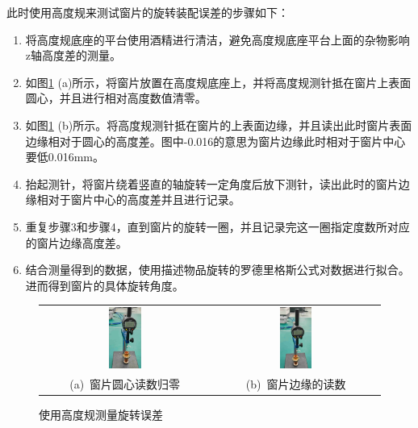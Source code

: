 \documentclass[master]{thesis-uestc}
\begin{document}
此时使用高度规来测试窗片的旋转装配误差的步骤如下：
\begin{enumerate}
    \item 将高度规底座的平台使用酒精进行清洁，避免高度规底座平台上面的杂物影响z轴高度差的测量。
    \item 如图\ref{fig:高度规测量旋转误差} (a)所示，将窗片放置在高度规底座上，并将高度规测针抵在窗片上表面圆心，并且进行相对高度数值清零。
    \item 如图\ref{fig:高度规测量旋转误差} (b)所示。将高度规测针抵在窗片的上表面边缘，并且读出此时窗片表面边缘相对于圆心的高度差。图中-0.016的意思为窗片边缘此时相对于窗片中心要低0.016mm。
    \item 抬起测针，将窗片绕着竖直的轴旋转一定角度后放下测针，读出此时的窗片边缘相对于窗片中心的高度差并且进行记录。
    \item 重复步骤3和步骤4，直到窗片的旋转一圈，并且记录完这一圈指定度数所对应的窗片边缘高度差。
    \item 结合测量得到的数据，使用描述物品旋转的罗德里格斯公式对数据进行拟合。进而得到窗片的具体旋转角度。
\end{enumerate}
\begin{figure}[!htb]
    \small
    \centering
    \begin{tabular}{@{\ }c@{\ }c}
        \includegraphics[width=0.2\textwidth]{pic/chapter5/高度规窗片中心.jpg} &
        \hspace{5pt}
        \includegraphics[width=0.2\textwidth]{pic/chapter5/高度规窗片边缘.jpg}     \\
        \mbox{\small (a) 窗片圆心读数归零}                                                                               &
        \mbox{\small (b) 窗片边缘的读数}                                                                                  \\
    \end{tabular}
    \caption{使用高度规测量旋转误差}
    \label{fig:高度规测量旋转误差}
\end{figure}
\end{document}
